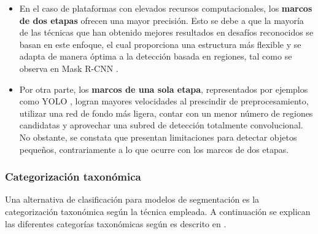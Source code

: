 \begin{itemize}
\setlength\itemsep{-0.3em}
    \item En el caso de plataformas con elevados recursos computacionales, los \textbf{marcos de dos etapas} ofrecen una mayor precisión. Esto se debe a que la mayoría de las técnicas que han obtenido mejores resultados en desafíos reconocidos se basan en este enfoque, el cual proporciona una estructura más flexible y se adapta de manera óptima a la detección basada en regiones, tal como se observa en Mask R-CNN \cite{MaskRCNN}.
    \item Por otra parte, los \textbf{marcos de una sola etapa}, representados por ejemplos como YOLO \cite{YOLO}, logran mayores velocidades al prescindir de preprocesamiento, utilizar una red de fondo más ligera, contar con un menor número de regiones candidatas y aprovechar una subred de detección totalmente convolucional. No obstante, se constata que presentan limitaciones para detectar objetos pequeños, contrariamente a lo que ocurre con los marcos de dos etapas.
\end{itemize}

\subsubsection{Categorización taxonómica}
Una alternativa de clasificación para modelos de segmentación es la categorización taxonómica según la técnica empleada. A continuación se explican las diferentes categorías taxonómicas según es descrito en \cite[Hafiz y Bhat, 2020]{Hafiz2020}.

